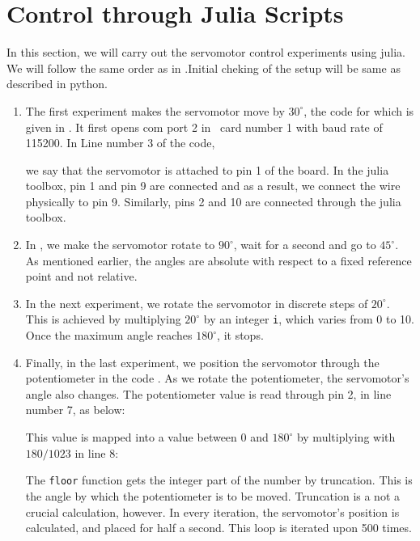 \section{Control through Julia Scripts}
\label{sec:servo-julia}
In this section, we will carry out the servomotor control experiments
using julia.  We will follow the same order as in
.Initial cheking of the setup will be same as
described in python.

\begin{enumerate}
\item The first experiment makes the servomotor move by $30^\circ$,
  the code for which is given in .
  It first opens com port 2 in \arduino\ card number 1 with baud rate
  of 115200.  In Line number 3 of the code, \ie\
  
  we say that the servomotor is attached to pin 1 of the board.
  In the julia toolbox, pin 1 and pin
  9 are connected and as a result, we connect the wire physically to
  pin 9.  Similarly, pins 2 and 10 are connected through the
  julia toolbox.

\item In , we make the servomotor rotate
  to $90^\circ$, wait for a second and go to $45^\circ$.  As mentioned
  earlier, the angles are absolute with respect to a fixed reference
  point and not relative.  

\item In the next experiment, we rotate the servomotor in discrete
  steps of $20^\circ$.  This is achieved by multiplying $20^\circ$ by
  an integer {\tt i}, which varies from 0 to 10.  Once the maximum
  angle reaches $180^\circ$, it stops.  

\item Finally, in the last experiment, we position the servomotor
  through the potentiometer in the code .  As we
  rotate the potentiometer, the servomotor's angle also changes.  The
  potentiometer value is read through pin 2, in line number 7, as
  below:
  
  This value is mapped into a value between 0 and $180^\circ$ by
  multiplying with $180/1023$ in line 8:
  
  The {\tt floor} function gets the integer part of the number by
  truncation.  This is the angle by which the potentiometer is to be
  moved.  Truncation is a not a crucial calculation, however.  In
  every iteration, the servomotor's position is calculated, and placed
  for half a second.  This loop is iterated upon 500 times.
\end{enumerate}

